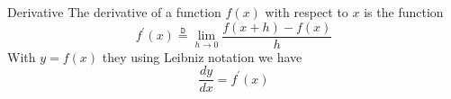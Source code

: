 \documentclass[preview]{standalone}
\begin{document}
\begin{defn*}{Derivative}
  The derivative of a function $f\left(x\right)$ with respect to $x$ is the function
  \[
    f^\prime\left(x\right) \stackrel{\mathtt{D}}{=} \lim_{h\to 0} \frac{f\left(x  +  h\right)  -  f\left(x\right)}{h}
  \]
  With $y = f\left(x\right)$ they using Leibniz notation we have
  \[
  \frac{dy}{dx} = f ^{\prime}\left(x\right)
  \]
\end{defn*}
\end{document}

